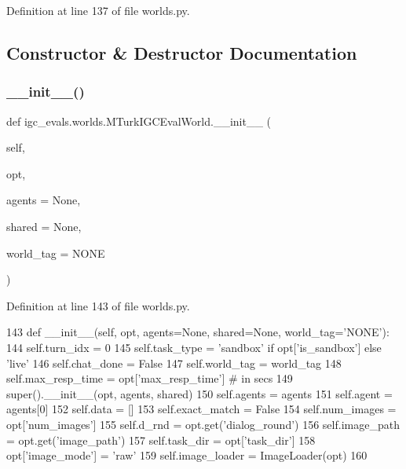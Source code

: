 Definition at line 137 of file worlds.\+py.



\subsection{Constructor \& Destructor Documentation}
\mbox{\label{classigc__evals_1_1worlds_1_1MTurkIGCEvalWorld_a917456c1cd24f8472e602699eb52413b}} 
\subsubsection{\texorpdfstring{\+\_\+\+\_\+init\+\_\+\+\_\+()}{\_\_init\_\_()}}
{\footnotesize\ttfamily def igc\+\_\+evals.\+worlds.\+M\+Turk\+I\+G\+C\+Eval\+World.\+\_\+\+\_\+init\+\_\+\+\_\+ (\begin{DoxyParamCaption}\item[{}]{self,  }\item[{}]{opt,  }\item[{}]{agents = {\ttfamily None},  }\item[{}]{shared = {\ttfamily None},  }\item[{}]{world\+\_\+tag = {\ttfamily \textquotesingle{}NONE\textquotesingle{}} }\end{DoxyParamCaption})}



Definition at line 143 of file worlds.\+py.


\begin{DoxyCode}
143     \textcolor{keyword}{def }\_\_init\_\_(self, opt, agents=None, shared=None, world\_tag='NONE'):
144         self.turn\_idx = 0
145         self.task\_type = \textcolor{stringliteral}{'sandbox'} \textcolor{keywordflow}{if} opt[\textcolor{stringliteral}{'is\_sandbox'}] \textcolor{keywordflow}{else} \textcolor{stringliteral}{'live'}
146         self.chat\_done = \textcolor{keyword}{False}
147         self.world\_tag = world\_tag
148         self.max\_resp\_time = opt[\textcolor{stringliteral}{'max\_resp\_time'}]  \textcolor{comment}{# in secs}
149         super().\_\_init\_\_(opt, agents, shared)
150         self.agents = agents
151         self.agent = agents[0]
152         self.data = []
153         self.exact\_match = \textcolor{keyword}{False}
154         self.num\_images = opt[\textcolor{stringliteral}{'num\_images'}]
155         self.d\_rnd = opt.get(\textcolor{stringliteral}{'dialog\_round'})
156         self.image\_path = opt.get(\textcolor{stringliteral}{'image\_path'})
157         self.task\_dir = opt[\textcolor{stringliteral}{'task\_dir'}]
158         opt[\textcolor{stringliteral}{'image\_mode'}] = \textcolor{stringliteral}{'raw'}
159         self.image\_loader = ImageLoader(opt)
160 
\end{DoxyCode}


